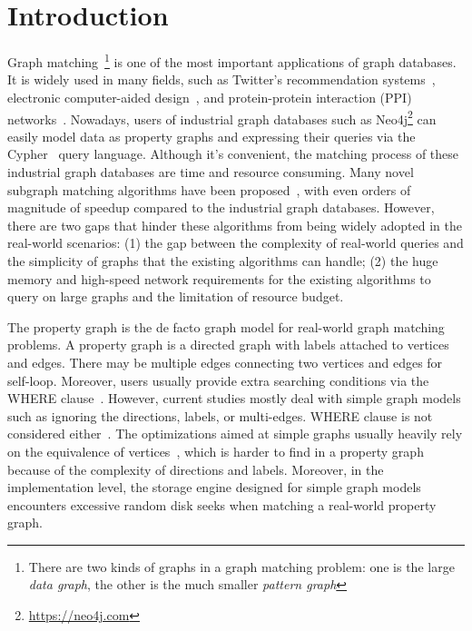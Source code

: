 \section{Introduction}
Graph matching~\footnote{There are two kinds of graphs in a graph matching problem: one is the large \emph{data graph}, the other is the much smaller \emph{pattern graph}} is one of the most important applications of graph databases.
It is widely used in many fields,
such as Twitter's recommendation systems~\cite{DBLP:journals/pvldb/GuptaSGGZLL14,DBLP:journals/pvldb/SharmaJBLL16},
electronic computer-aided design~\cite{DBLP:conf/dac/OhlrichEGS93},
and protein-protein interaction (PPI) networks~\cite{milenkovic2008uncovering}.
Nowadays, users of industrial graph databases such as Neo4j\footnote{\url{https://neo4j.com}}
can easily model data as property graphs and expressing their queries via the Cypher~\cite{DBLP:conf/sigmod/FrancisGGLLMPRS18} query language.
Although it's convenient, the matching process of these industrial graph databases are time and resource consuming.
Many novel subgraph matching algorithms have been proposed~\cite{DBLP:journals/pvldb/SunWWSL12,DBLP:conf/sigmod/HanLL13,DBLP:conf/sigmod/ShaoCCMYX14,DBLP:conf/cloud/SerafiniMS17,DBLP:journals/pvldb/QiaoZC17,DBLP:conf/sigmod/DiasTGM019}, with even orders of magnitude of speedup compared to the industrial graph databases.
However, there are two gaps that hinder these algorithms from being widely adopted in the real-world scenarios:
(1) the gap between the complexity of real-world queries and the simplicity of graphs that the existing algorithms can handle;
(2) the huge memory and high-speed network requirements for the existing algorithms to query on large graphs and the limitation of resource budget.

The property graph is the de facto graph model for real-world graph matching problems.
A property graph is a directed graph with labels attached to vertices and edges.
There may be multiple edges connecting two vertices and edges for self-loop.
Moreover, users usually provide extra searching conditions via the WHERE clause~\cite{DBLP:journals/csur/AnglesABHRV17}. However,  current studies mostly deal with simple graph models such as ignoring the directions, labels, or multi-edges. WHERE clause is not considered either~\cite{DBLP:journals/pvldb/SunWWSL12,DBLP:conf/sigmod/HanLL13,DBLP:conf/sigmod/KimLBHLKJ16,DBLP:journals/pvldb/QiaoZC17,DBLP:journals/pvldb/MhedhbiS19}. The optimizations aimed at simple graphs usually heavily rely on the equivalence of vertices~\cite{DBLP:conf/sigmod/HanLL13,DBLP:journals/pvldb/QiaoZC17}, which is harder to find in a property graph because of the complexity of directions and labels. Moreover, in the implementation level, the storage engine designed for simple graph models encounters excessive random disk seeks when matching a real-world property graph.

